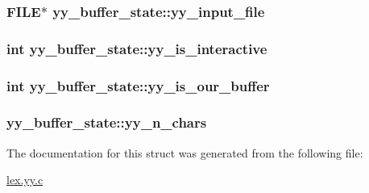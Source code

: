 \subsubsection[{yy\+\_\+input\+\_\+file}]{\setlength{\rightskip}{0pt plus 5cm}F\+I\+L\+E$\ast$ yy\+\_\+buffer\+\_\+state\+::yy\+\_\+input\+\_\+file}\label{structyy__buffer__state_a4843d1422e3276b636d475a3095bd948}
\hypertarget{structyy__buffer__state_abf5c70eea75581b58c0ee7bd31b14490}{}
\subsubsection[{yy\+\_\+is\+\_\+interactive}]{\setlength{\rightskip}{0pt plus 5cm}int yy\+\_\+buffer\+\_\+state\+::yy\+\_\+is\+\_\+interactive}\label{structyy__buffer__state_abf5c70eea75581b58c0ee7bd31b14490}
\hypertarget{structyy__buffer__state_a80ce2431c70dc4f89ced487f18449465}{}
\subsubsection[{yy\+\_\+is\+\_\+our\+\_\+buffer}]{\setlength{\rightskip}{0pt plus 5cm}int yy\+\_\+buffer\+\_\+state\+::yy\+\_\+is\+\_\+our\+\_\+buffer}\label{structyy__buffer__state_a80ce2431c70dc4f89ced487f18449465}
\hypertarget{structyy__buffer__state_afcc44872643f513e79b43c2b1f334a67}{}
\subsubsection[{yy\+\_\+n\+\_\+chars}]{ yy\+\_\+buffer\+\_\+state\+::yy\+\_\+n\+\_\+chars}\label{structyy__buffer__state_afcc44872643f513e79b43c2b1f334a67}


The documentation for this struct was generated from the following file\+:\begin{DoxyCompactItemize}
\item 
\hyperlink{lex_8yy_8c}{lex.\+yy.\+c}\end{DoxyCompactItemize}
